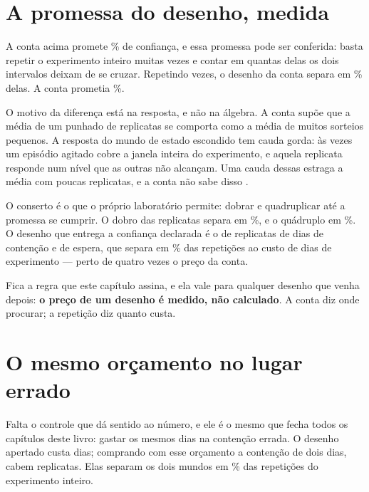 \section{A promessa do desenho, medida}

A conta acima promete \numDesenhoConfiancaPct\% de confiança, e essa promessa pode ser conferida:
basta repetir o experimento inteiro muitas vezes e contar em quantas delas os dois intervalos
deixam de se cruzar. Repetindo \numDesenhoMeta{} vezes, o desenho da conta separa em
\numDesenhoSeparaPlanejadaPct\% delas. A conta prometia \numDesenhoConfiancaPct\%\cite{wasserman2020universal}.

O motivo da diferença está na resposta, e não na álgebra. A conta supõe que a média de um punhado
de replicatas se comporta como a média de muitos sorteios pequenos. A resposta do mundo de estado
escondido tem cauda gorda: às vezes um episódio agitado cobre a janela inteira do experimento, e
aquela replicata responde num nível que as outras não alcançam. Uma cauda dessas estraga a média
com poucas replicatas, e a conta não sabe disso \cite{taleb2020much}.

O conserto é o que o próprio laboratório permite: dobrar e quadruplicar até a promessa se cumprir.
O dobro das replicatas separa em \numDesenhoSeparaDobroPct\%, e o quádruplo em
\numDesenhoSeparaQuadruploPct\%. O desenho que entrega a confiança declarada é o de
\numDesenhoEntregueReplicatas{} replicatas de \numDesenhoApertadoContensao{} dias de contenção e
\numDesenhoEspera{} de espera, que separa em \numDesenhoEntreguePct\% das repetições ao custo de
\numDesenhoEntregueDias{} dias de experimento ---
perto de quatro vezes o preço da conta.

Fica a regra que este capítulo assina, e ela vale para qualquer desenho que venha depois:
\textbf{o preço de um desenho é medido, não calculado}. A conta diz onde procurar; a repetição diz
quanto custa.

\section{O mesmo orçamento no lugar errado}

Falta o controle que dá sentido ao número, e ele é o mesmo que fecha todos os capítulos deste
livro: gastar os mesmos dias na contenção errada. O desenho apertado custa
\numDesenhoApertadoDias{} dias; comprando com esse orçamento a contenção de dois dias, cabem
\numDesenhoMesmaContaReplicatas{} replicatas. Elas separam os dois mundos em
\numDesenhoSeparaCurtaPct\% das repetições do experimento inteiro.

